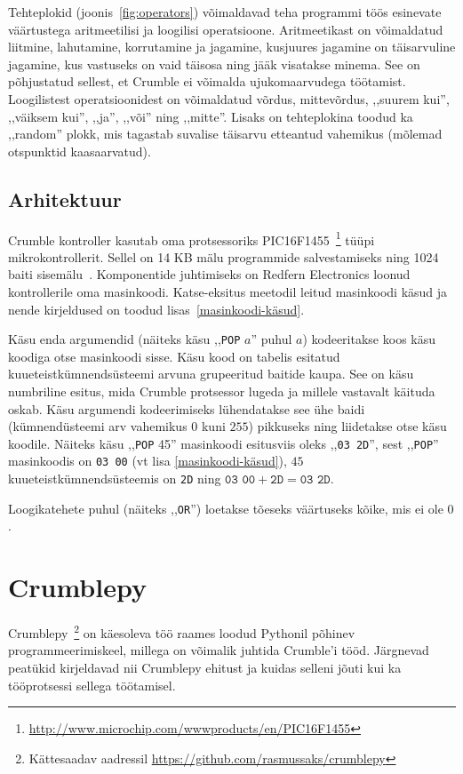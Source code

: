 \documentclass[12pt]{article}
\begin{document}
Tehteplokid (joonis~\ref{fig:operators}) võimaldavad teha programmi töös esinevate väärtustega aritmeetilisi ja loogilisi operatsioone. Aritmeetikast on võimaldatud liitmine, lahutamine, korrutamine ja jagamine, kusjuures jagamine on täisarvuline jagamine, kus vastuseks on vaid täisosa ning jääk visatakse minema. See on põhjustatud sellest, et Crumble ei võimalda ujukomaarvudega töötamist. Loogilistest operatsioonidest on võimaldatud võrdus, mittevõrdus, ,,suurem kui'', ,,väiksem kui'', ,,ja'', ,,või'' ning ,,mitte''. Lisaks on tehteplokina toodud ka ,,random'' plokk, mis tagastab suvalise täisarvu etteantud vahemikus (mõlemad otspunktid kaasaarvatud).

\subsection{Arhitektuur}

Crumble kontroller kasutab oma protsessoriks PIC16F1455~\footnote{\url{http://www.microchip.com/wwwproducts/en/PIC16F1455}} tüüpi mikrokontrollerit. Sellel on 14 KB mälu programmide salvestamiseks ning 1024 baiti sisemälu~\cite{PIC16F1455}. Komponentide juhtimiseks on Redfern Electronics loonud kontrollerile oma masinkoodi. Katse-eksitus meetodil leitud masinkoodi käsud ja nende kirjeldused on toodud lisas~\ref{masinkoodi-käsud}. 


Käsu enda argumendid (näiteks käsu ,,\texttt{POP} $a$'' puhul $a$) kodeeritakse koos käsu koodiga otse masinkoodi sisse. Käsu kood on tabelis esitatud kuueteistkümnendsüsteemi arvuna grupeeritud baitide kaupa. See on käsu numbriline esitus, mida Crumble protsessor lugeda ja millele vastavalt käituda oskab. Käsu argumendi kodeerimiseks lühendatakse see ühe baidi (kümnendüsteemi arv vahemikus $0$ kuni $255$) pikkuseks ning liidetakse otse käsu koodile. Näiteks käsu ,,\texttt{POP} 45'' masinkoodi esitusviis oleks ,,\texttt{03~2D}'', sest ,,\texttt{POP}'' masinkoodis on \texttt{03 00} (vt lisa \ref{masinkoodi-käsud}), $45$ kuueteistkümnendsüsteemis on \texttt{2D} ning $\texttt{03 00} + \texttt{2D} = \texttt{03 2D}$.

Loogikatehete puhul (näiteks ,,\texttt{OR}'') loetakse tõeseks väärtuseks kõike, mis ei ole $0$.


\section{Crumblepy}

Crumblepy~\footnote{Kättesaadav aadressil \url{https://github.com/rasmussaks/crumblepy}} on käesoleva töö raames loodud Pythonil põhinev programmeerimiskeel, millega on võimalik juhtida Crumble'i tööd. Järgnevad peatükid kirjeldavad nii Crumblepy ehitust ja kuidas selleni jõuti kui ka tööprotsessi sellega töötamisel.
\end{document}
